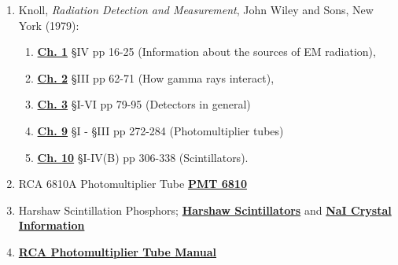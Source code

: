 \documentclass{../lab}
\begin{document}
\begin{enumerate}
    \item Knoll, \emph{Radiation Detection and Measurement}, John Wiley and Sons, New York (1979):
    \begin{enumerate}
        \item \href{http://physics111.lib.berkeley.edu/Physics111/Reprints/GMA/01-Radiation\_Detection\_and\_Measurement\_CH\_01.pdf}{\textbf{Ch. 1}} \S IV pp 16-25 (Information about the sources of EM radiation),
        
        \item \href{http://physics111.lib.berkeley.edu/Physics111/Reprints/GMA/01-Radiation\_Detection\_and\_Measurement\_CH\_02.pdf}{\textbf{Ch. 2}} \S III pp 62-71 (How gamma rays interact),
        
        \item \href{http://physics111.lib.berkeley.edu/Physics111/Reprints/GMA/01-Radiation\_Detection\_and\_Measurement\_CH\_03.pdf}{\textbf{Ch. 3}} \S I-VI pp 79-95 (Detectors in general)
        
        \item \href{http://physics111.lib.berkeley.edu/Physics111/Reprints/GMA/01-Radiation\_Detection\_and\_Measurement\_CH\_09.pdf}{\textbf{Ch. 9}} \S I - \S III pp 272-284 (Photomultiplier tubes)
        
        \item \href{http://physics111.lib.berkeley.edu/Physics111/Reprints/GMA/01-Radiation\_Detection\_and\_Measurement\_CH\_10.pdf}{\textbf{Ch. 10}} \S I-IV(B) pp 306-338 (Scintillators).
    \end{enumerate}
    
    \item RCA 6810A Photomultiplier Tube \href{http://physics111.lib.berkeley.edu/Physics111/Reprints/GMA/OCR\%20RCA\%206810A\%20photomultiplier\%20tube.pdf}{\textbf{PMT 6810}}

    \item Harshaw Scintillation Phosphors; \href{http://physics111.lib.berkeley.edu/Physics111/Reprints/GMA/Harshaw\%20scintillation\%20phosphors.pdf}{\textbf{Harshaw Scintillators}} and \href{http://experimentationlab.berkeley.edu/sites/default/files/pdfs/Nal\_Crystal\_Information.pdf}{\textbf{NaI Crystal Information}}
    
    \item \href{http://physics111.lib.berkeley.edu/Physics111/Reprints/GMA/RCA\%20PMT.pdf}{\textbf{RCA Photomultiplier Tube Manual}}
    
\end{enumerate}
\end{document}
